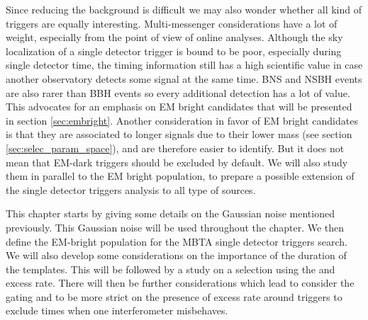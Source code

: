 Since reducing the background is difficult we may also wonder whether all kind of triggers are equally interesting.
Multi-messenger considerations have a lot of weight, especially from the point of view of online analyses.
Although the sky localization of a single detector trigger is bound to be poor, especially during single detector time, the timing information still has a high scientific value in case another observatory detects some signal at the same time.
BNS and NSBH events are also rarer than BBH events so every additional detection has a lot of value.
This advocates for an emphasis on EM bright candidates that will be presented in section \ref{sec:embright}.
Another consideration in favor of EM bright candidates is that they are associated to longer signals due to their lower mass (see section \ref{sec:selec_param_space}), and are therefore easier to identify.
But it does not mean that EM-dark triggers should be excluded by default.
We will also study them in parallel to the EM bright population, to prepare a possible extension of the single detector triggers analysis to all type of sources.

This chapter starts by giving some details on the Gaussian noise mentioned previously.
This Gaussian noise will be used throughout the chapter.
We then define the EM-bright population for the MBTA single detector triggers search.
We will also develop some considerations on the importance of the duration of the templates.
This will be followed by a study on a selection using the \achi and excess rate.
There will then be further considerations which lead to consider the gating and to be more strict on the presence of excess rate around triggers to exclude times when one interferometer misbehaves.


